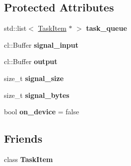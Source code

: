 \subsection*{Protected Attributes}
\begin{DoxyCompactItemize}
\item 
std\+::list$<$ \hyperlink{classjaspl_1_1ocl_1_1_task_item}{Task\+Item} $\ast$ $>$ {\bfseries task\+\_\+queue}\hypertarget{classjaspl_1_1ocl_1_1_task_queue_base_a62a834cd1aa09f8387685a40bbe373c6}{}\label{classjaspl_1_1ocl_1_1_task_queue_base_a62a834cd1aa09f8387685a40bbe373c6}

\item 
cl\+::\+Buffer {\bfseries signal\+\_\+input}\hypertarget{classjaspl_1_1ocl_1_1_task_queue_base_ac9d244ae1978be6bb3fc806faf99f220}{}\label{classjaspl_1_1ocl_1_1_task_queue_base_ac9d244ae1978be6bb3fc806faf99f220}

\item 
cl\+::\+Buffer {\bfseries output}\hypertarget{classjaspl_1_1ocl_1_1_task_queue_base_aefa39df1b87a263a89b91ce5de343495}{}\label{classjaspl_1_1ocl_1_1_task_queue_base_aefa39df1b87a263a89b91ce5de343495}

\item 
size\+\_\+t {\bfseries signal\+\_\+size}\hypertarget{classjaspl_1_1ocl_1_1_task_queue_base_adbcead862a33ae1a246570a7e24cf786}{}\label{classjaspl_1_1ocl_1_1_task_queue_base_adbcead862a33ae1a246570a7e24cf786}

\item 
size\+\_\+t {\bfseries signal\+\_\+bytes}\hypertarget{classjaspl_1_1ocl_1_1_task_queue_base_a1e5ba37a36ce10e34822ddf5686d2971}{}\label{classjaspl_1_1ocl_1_1_task_queue_base_a1e5ba37a36ce10e34822ddf5686d2971}

\item 
bool {\bfseries on\+\_\+device} = false\hypertarget{classjaspl_1_1ocl_1_1_task_queue_base_a30d1e5405a0eb3732756a1bb6fd97c8d}{}\label{classjaspl_1_1ocl_1_1_task_queue_base_a30d1e5405a0eb3732756a1bb6fd97c8d}

\end{DoxyCompactItemize}
\subsection*{Friends}
\begin{DoxyCompactItemize}
\item 
class {\bfseries Task\+Item}\hypertarget{classjaspl_1_1ocl_1_1_task_queue_base_aec7aa930b50aea7c2192347a80371a14}{}\label{classjaspl_1_1ocl_1_1_task_queue_base_aec7aa930b50aea7c2192347a80371a14}

\end{DoxyCompactItemize}
